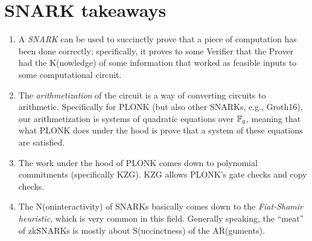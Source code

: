 \section{SNARK takeaways}
\begin{tcolorbox}[takeaways]
\begin{enumerate}
\item
  A \emph{SNARK} can be used to succinctly prove that a piece of
  computation has been done correctly; specifically, it proves to some
  Verifier that the Prover had the K(nowledge) of some information that
  worked as feasible inputs to some computational circuit.
\item
  The \emph{arithmetization} of the circuit is a way of converting
  circuits to arithmetic. Specifically for PLONK (but also other SNARKs,
  e.g., Groth16), our arithmetization is systems of quadratic equations
  over $\mathbb{F}_{q}$, meaning that what PLONK does under the hood
  is prove that a system of these equations are satisfied.
\item
  The work under the hood of PLONK comes down to polynomial commitments
  (specifically KZG). KZG allows PLONK's gate checks and copy checks.
\item
  The N(oninteractivity) of SNARKs basically comes down to the
  \emph{Fiat-Shamir heuristic}, which is very common in this field.
  Generally speaking, the ``meat'' of zkSNARKs is mostly about
  S(uccinctness) of the AR(guments).
\end{enumerate}
\end{tcolorbox}
